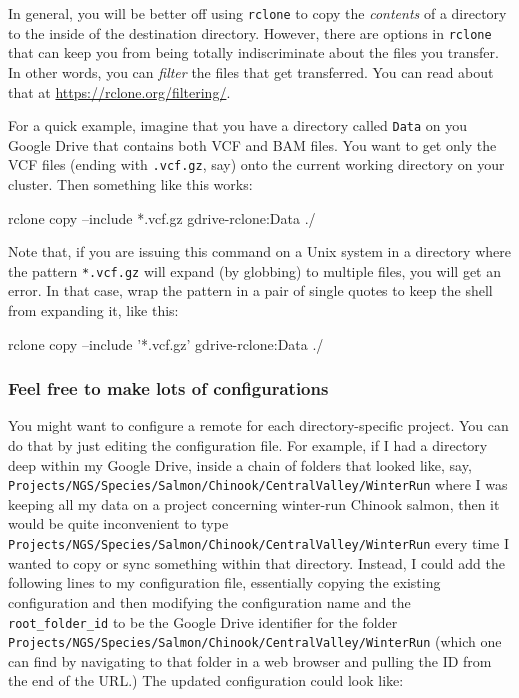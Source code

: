 \documentclass[]{krantz}
\makeatletter
\newenvironment{Shaded}{\begin{snugshade}}{\end{snugshade}}
\newcommand{\ExtensionTok}[1]{#1}
\newcommand{\NormalTok}[1]{#1}
\newcommand{\StringTok}[1]{\textcolor[rgb]{0.5,0.5,0.5}{#1}}
\newenvironment{kframe}{%
\medskip{}
\setlength{\fboxsep}{.8em}
 \def\at@end@of@kframe{}%
 \ifinner\ifhmode%
  \def\at@end@of@kframe{\end{minipage}}%
  \begin{minipage}{\columnwidth}%
 \fi\fi%
 \def\FrameCommand##1{\hskip\@totalleftmargin \hskip-\fboxsep
 \colorbox{shadecolor}{##1}\hskip-\fboxsep
     \hskip-\linewidth \hskip-\@totalleftmargin \hskip\columnwidth}%
 \MakeFramed {\advance\hsize-\width
   \@totalleftmargin\z@ \linewidth\hsize
   \@setminipage}}%
 {\par\unskip\endMakeFramed%
 \at@end@of@kframe}
\renewenvironment{Shaded}{\begin{kframe}}{\end{kframe}}
\makeatother
\begin{document}
In general, you will be better off using \texttt{rclone} to copy the \emph{contents} of a directory
to the inside of the destination directory. However, there are options in \texttt{rclone} that
can keep you from being totally indiscriminate about the files you transfer. In other words,
you can \emph{filter} the files that get transferred. You can read about that at
\url{https://rclone.org/filtering/}.

For a quick example, imagine that you have a directory called \texttt{Data} on you Google Drive
that contains both VCF and BAM files. You want to get only the VCF files (ending with \texttt{.vcf.gz}, say)
onto the current working directory on your cluster. Then something like this works:

\begin{Shaded}
\begin{Highlighting}[]
\ExtensionTok{rclone}\NormalTok{ copy --include *.vcf.gz gdrive-rclone:Data ./}
\end{Highlighting}
\end{Shaded}

Note that, if you are issuing this command on a Unix system in a directory
where the pattern \texttt{*.vcf.gz} will expand (by globbing) to multiple files, you will
get an error. In that case, wrap the pattern in a pair of single quotes to keep
the shell from expanding it, like this:

\begin{Shaded}
\begin{Highlighting}[]
\ExtensionTok{rclone}\NormalTok{ copy --include }\StringTok{'*.vcf.gz'}\NormalTok{ gdrive-rclone:Data ./}
\end{Highlighting}
\end{Shaded}

\hypertarget{feel-free-to-make-lots-of-configurations}{%
\subsubsection{Feel free to make lots of configurations}\label{feel-free-to-make-lots-of-configurations}}

You might want to configure a remote for each directory-specific project.
You can do that by just editing the configuration file. For example,
if I had a directory deep within my Google Drive, inside a chain of folders that
looked like, say, \texttt{Projects/NGS/Species/Salmon/Chinook/CentralValley/WinterRun}
where I was keeping
all my data on a project concerning winter-run Chinook salmon, then it would be
quite inconvenient to type \texttt{Projects/NGS/Species/Salmon/Chinook/CentralValley/WinterRun}
every time I wanted to copy or sync something within that directory. Instead,
I could add the following
lines to my configuration file, essentially copying the existing configuration and
then modifying the configuration name and the \texttt{root\_folder\_id} to be the
Google Drive identifier for the folder \texttt{Projects/NGS/Species/Salmon/Chinook/CentralValley/WinterRun} (which
one can find by navigating to that folder in a web browser and pulling the ID from the
end of the URL.) The updated configuration could look like:
\end{document}
